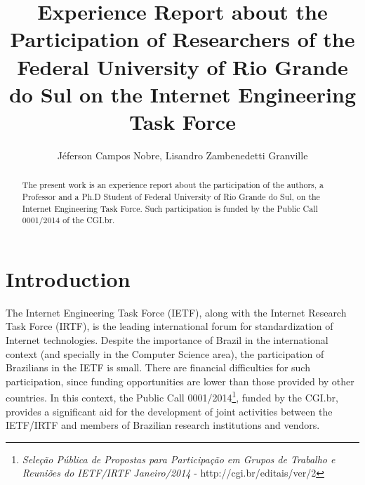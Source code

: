 \documentclass[12pt]{article}
\title{Experience Report about the Participation of Researchers of the Federal University of Rio Grande do Sul on the Internet Engineering Task Force}
\author{J{\'e}ferson Campos Nobre, Lisandro Zambenedetti Granville}
\begin{document}
 

\maketitle

\begin{abstract}

The present work is an experience report about the participation of the authors, a Professor and a Ph.D Student of Federal University of Rio Grande do Sul, on the Internet Engineering Task Force. Such participation is funded by the Public Call 0001/2014 of the CGI.br.

\end{abstract}

\section{Introduction}


The Internet Engineering Task Force (IETF), along with the Internet Research Task Force (IRTF), is the leading international forum for standardization of Internet technologies. Despite the importance of Brazil in the international context (and specially in the Computer Science area), the participation of Brazilians in the IETF is small. There are financial difficulties for such participation, since funding opportunities are lower than those provided by other countries. In this context, the Public Call 0001/2014\footnote{\textit{Seleção Pública de Propostas para Participação em Grupos de Trabalho e Reuniões do IETF/IRTF Janeiro/2014} - http://cgi.br/editais/ver/2}, funded by the CGI.br, provides a significant aid for the development of joint activities between the IETF/IRTF and members of Brazilian research institutions and vendors.
\end{document}
